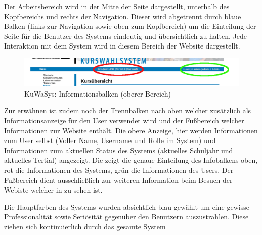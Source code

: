 \documentclass[12pt, twoside, a4paper, ngerman]{article}
\begin{document}
Der Arbeitsbereich wird in der Mitte der Seite dargestellt, unterhalb des Kopfbereichs und rechts der Navigation. 
Dieser wird abgetrennt durch blaue Balken (links zur Navigation sowie oben zum Kopfbereich) um die Einteilung der Seite für die Benutzer des Systems eindeutig und übersichtlich zu halten.
Jede Interaktion mit dem System wird in diesem Bereich der Website dargestellt. 

\begin{figure}[h]
 \begin{center}
   \includegraphics[scale=0.4]{img/informationbar_KuWaSys.png}
 \end{center}
 \caption[\textbf{KuWaSys: Informationsbalken (oberer Bereich)}]{KuWaSys: Informationsbalken (oberer Bereich)}
 \label{fig:infobar_KuWaSys}
\end{figure}

Zur erwähnen ist zudem noch der Trennbalken nach oben welcher zusätzlich als Informationsanzeige für den User verwendet wird und der Fußbereich welcher Informationen zur Website enthält. 
Die obere Anzeige, hier werden Informationen zum User selbst (Voller Name, Username und Rolle im System) und Informationen zum aktuellen Status des Systems (aktuelles Schuljahr und aktuelles Tertial) angezeigt.
Die  zeigt die genaue Einteilung des Infobalkens oben, rot die Informationen des Systems, grün die Informationen des Users.
Der Fußbereich dient ausschließlich zur weiteren Information beim Besuch der Webiste welcher in  zu sehen ist.  

Die Hauptfarben des Systems wurden absichtlich blau gewählt um eine gewisse Professionalität sowie Seriösität gegenüber den Benutzern auszustrahlen. Diese ziehen sich kontinuierlich durch das gesamte System

\end{document}
